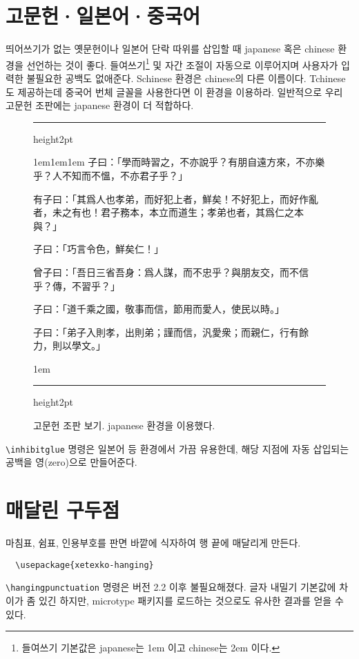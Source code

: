 \documentclass[a4paper]{article}
\def\grayhrule{{\color{white!80!black}\hrule height2pt}}
\def\grayvrule{{\color{white!80!black}\vrule width 2pt}}
\newenvironment{example}
  {\hbox\bgroup\grayvrule
    \vbox\bgroup\hsize\dimexpr\textwidth-4pt\relax
    \grayhrule\kern1em\leftskip1em\rightskip1em
  }{\par\kern1em\grayhrule\egroup\grayvrule\egroup}
\def\cs#1{\texttt{\textbackslash #1}}
\begin{document}
\section{고문헌·일본어·중국어}

띄어쓰기가 없는 옛문헌이나 일본어 단락 따위를 삽입할 때
japanese 혹은 chinese 환경을 선언하는 것이 좋다.
들여쓰기\footnote {들여쓰기 기본값은 japanese는 1em 이고 chinese는 2em 이다.}
및 자간 조절이 자동으로 이루어지며
사용자가 입력한 불필요한 공백도 없애준다.
Schinese 환경은 chinese의 다른 이름이다.
Tchinese도 제공하는데 중국어 번체 글꼴을 사용한다면 이 환경을 이용하라.
일반적으로 우리 고문헌 조판에는 japanese 환경이 더 적합하다.

\begin{figure}
  \begin{example}\linespread{1.3}
    \sffamily\japanese
子曰：「學而時習之，不亦說乎？有朋自遠方來，不亦樂乎？人不知而不慍，不亦君子乎？」\par
有子曰：「其爲人也孝弟，而好犯上者，鮮矣！不好犯上，而好作亂者，未之有也！君子務本，本立而道生；孝弟也者，其爲仁之本與？」\par
子曰：「巧言令色，鮮矣仁！」\par
曾子曰：「吾日三省吾身：爲人謀，而不忠乎？與朋友交，而不信乎？傳，不習乎？」\par
子曰：「道千乘之國，敬事而信，節用而愛人，使民以時。」\par
子曰：「弟子入則孝，出則弟；謹而信，汎愛衆；而親仁，行有餘力，則以學文。」
  \end{example}
\caption{고문헌 조판 보기. japanese 환경을 이용했다.}\label{fig:ancientdoc}
\end{figure}

\cs{inhibitglue} 명령은 일본어 등 환경에서 가끔 유용한데,
해당 지점에 자동 삽입되는 공백을 영(zero)으로
만들어준다.

\section{매달린 구두점}
마침표, 쉼표, 인용부호를 판면 바깥에 식자하여 행 끝에 매달리게 만든다.
\begin{verbatim}
  \usepackage{xetexko-hanging}
\end{verbatim}
\cs{hangingpunctuation} 명령은 버전 2.2 이후 불필요해졌다.
글자 내밀기 기본값에 차이가 좀 있긴 하지만,
microtype 패키지를 로드하는 것으로도 유사한 결과를 얻을 수 있다.

\end{document}
